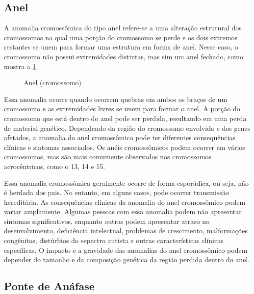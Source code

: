 \documentclass[11pt,a4paper]{article}
\begin{document}
\subsection*{Anel}

	A anomalia cromossômica do tipo anel refere-se a uma alteração estrutural dos cromossomos na qual uma porção do cromossomo se perde e os dois extremos restantes se unem para formar uma estrutura em forma de anel. Nesse caso, o cromossomo não possui extremidades distintas, mas sim um anel fechado, como mostra a \ref{fig:aberracaoAnel}.

	\begin{figure}
		\caption{Anel (cromossomo)}
		\label{fig:aberracaoAnel}
	\end{figure}	

	Essa anomalia ocorre quando ocorrem quebras em ambos os braços de um cromossomo e as extremidades livres se unem para formar o anel. A porção do cromossomo que está dentro do anel pode ser perdida, resultando em uma perda de material genético. Dependendo da região do cromossomo envolvida e dos genes afetados, a anomalia do anel cromossômico pode ter diferentes consequências clínicas e sintomas associados. Os anéis cromossômicos podem ocorrer em vários cromossomos, mas são mais comumente observados nos cromossomos acrocêntricos, como o 13, 14 e 15.
	
	Essa anomalia cromossômica geralmente ocorre de forma esporádica, ou seja, não é herdada dos pais. No entanto, em alguns casos, pode ocorrer transmissão hereditária. As consequências clínicas da anomalia do anel cromossômico podem variar amplamente. Algumas pessoas com essa anomalia podem não apresentar sintomas significativos, enquanto outras podem apresentar atraso no desenvolvimento, deficiência intelectual, problemas de crescimento, malformações congênitas, distúrbios do espectro autista e outras características clínicas específicas. O impacto e a gravidade das anomalias do anel cromossômico podem depender do tamanho e da composição genética da região perdida dentro do anel.


\subsection*{Ponte de Anáfase}
\end{document}
